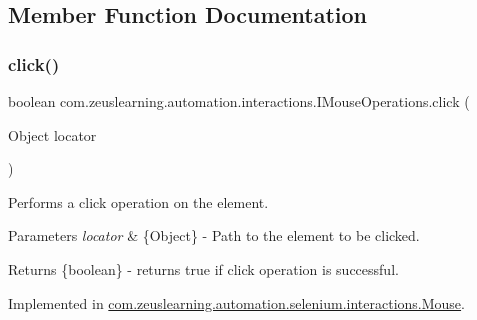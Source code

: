 \subsection{Member Function Documentation}
\hypertarget{interfacecom_1_1zeuslearning_1_1automation_1_1interactions_1_1IMouseOperations_a644236cb97197227ac80084abb3d95b0}{}\label{interfacecom_1_1zeuslearning_1_1automation_1_1interactions_1_1IMouseOperations_a644236cb97197227ac80084abb3d95b0} 
\subsubsection{\texorpdfstring{click()}{click()}\hspace{0.1cm}{\footnotesize\ttfamily [1/2]}}
{\footnotesize\ttfamily boolean com.\+zeuslearning.\+automation.\+interactions.\+I\+Mouse\+Operations.\+click (\begin{DoxyParamCaption}\item[{Object}]{locator }\end{DoxyParamCaption})}

Performs a click operation on the element.


\begin{DoxyParams}{Parameters}
{\em locator} & \{Object\} -\/ Path to the element to be clicked.\\
\hline
\end{DoxyParams}
\begin{DoxyReturn}{Returns}
\{boolean\} -\/ returns {\ttfamily true} if click operation is successful. 
\end{DoxyReturn}


Implemented in \hyperlink{classcom_1_1zeuslearning_1_1automation_1_1selenium_1_1interactions_1_1Mouse_a60a08540de50836519b5a6e2b0dc40fe}{com.\+zeuslearning.\+automation.\+selenium.\+interactions.\+Mouse}.

\hypertarget{interfacecom_1_1zeuslearning_1_1automation_1_1interactions_1_1IMouseOperations_aacf192b585aefaf99d61f34f68b841e4}{}\label{interfacecom_1_1zeuslearning_1_1automation_1_1interactions_1_1IMouseOperations_aacf192b585aefaf99d61f34f68b841e4} 
